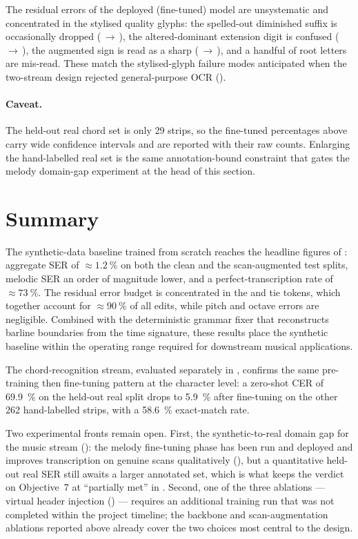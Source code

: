 The residual errors of the deployed (fine-tuned) model are
unsystematic and concentrated in the stylised quality glyphs: the
spelled-out diminished suffix is occasionally dropped
(\,$\to$\,), the altered-dominant extension digit
is confused (\,$\to$\,), the augmented sign is read
as a sharp (\,$\to$\,), and a handful of root
letters are mis-read.  These match the stylised-glyph failure modes
anticipated when the two-stream design rejected general-purpose OCR
().

\paragraph{Caveat.}
The held-out real chord set is only \num{29} strips, so the
fine-tuned percentages above carry wide confidence intervals and are
reported with their raw counts.  Enlarging the hand-labelled real set
is the same annotation-bound constraint that gates the melody
domain-gap experiment at the head of this section.

\section{Summary}
\label{sec:res-summary}

The synthetic-data baseline trained from scratch reaches the headline
figures of : aggregate SER of
$\approx\SI{1.2}{\percent}$ on both the clean and the scan-augmented test
splits, melodic SER an order of magnitude lower, and a
perfect-transcription rate of $\approx\SI{73}{\percent}$.
The residual error budget is concentrated in the  and
tie tokens, which together account for $\approx \SI{90}{\percent}$ of
all edits, while pitch and octave errors are negligible.
Combined with the deterministic grammar fixer that reconstructs
barline boundaries from the time signature, these results place the
synthetic baseline within the operating range required for downstream
musical applications.

The chord-recognition stream, evaluated separately in ,
confirms the same pre-training then fine-tuning pattern at the character
level: a zero-shot CER of \SI{69.9}{\percent} on the held-out real split drops
to \SI{5.9}{\percent} after fine-tuning on the other \num{262} hand-labelled
strips, with a \SI{58.6}{\percent} exact-match rate.

Two experimental fronts remain open.
First, the synthetic-to-real domain gap for the music stream
(): the melody fine-tuning phase has been run
and deployed and improves transcription on genuine scans qualitatively
(), but a quantitative held-out real SER still
awaits a larger annotated set, which is what keeps the verdict on
Objective~7 at \enquote{partially met} in .
Second, one of the three ablations --- virtual header injection
() --- requires an additional training run that
was not completed within the project timeline; the backbone and
scan-augmentation ablations reported above already cover the two choices
most central to the design.
